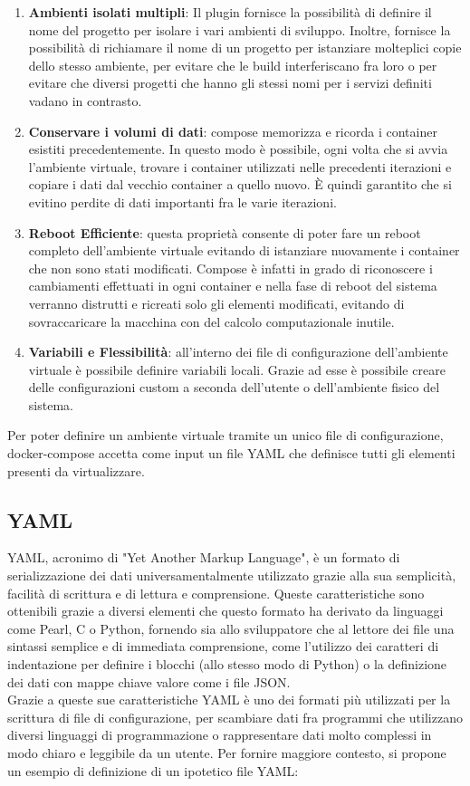 \begin{enumerate}
    \item \textbf{Ambienti isolati multipli}: Il plugin fornisce la possibilità di definire il nome del progetto per isolare i vari ambienti di sviluppo. Inoltre, fornisce la possibilità di richiamare il nome di un progetto per istanziare molteplici copie dello stesso ambiente, per evitare che le build interferiscano fra loro o 
        per evitare che diversi progetti che hanno gli stessi nomi per i servizi definiti vadano in contrasto.
    \item \textbf{Conservare i volumi di dati}: compose memorizza e ricorda i container esistiti precedentemente. In questo modo è possibile, ogni volta che si avvia l'ambiente virtuale, trovare i container utilizzati nelle precedenti iterazioni e copiare i dati dal vecchio container a quello nuovo. 
        È quindi garantito che si evitino perdite di dati importanti fra le varie iterazioni. 
    \item \textbf{Reboot Efficiente}: questa proprietà consente di poter fare un reboot completo dell'ambiente virtuale evitando di istanziare nuovamente i container che non sono stati modificati. Compose è infatti in grado di riconoscere i cambiamenti effettuati in ogni container e nella fase di reboot del sistema verranno distrutti e ricreati
        solo gli elementi modificati, evitando di sovraccaricare la macchina con del calcolo computazionale inutile.
    \item \textbf{Variabili e Flessibilità}: all'interno dei file di configurazione dell'ambiente virtuale è possibile definire variabili locali. Grazie ad esse è possibile creare delle configurazioni custom a seconda dell'utente o dell'ambiente fisico del sistema.
\end{enumerate}

Per poter definire un ambiente virtuale tramite un unico file di configurazione, docker-compose accetta come input un file YAML che definisce tutti gli elementi presenti da virtualizzare. 

\subsection{YAML}
YAML\cite{yaml}, acronimo di "Yet Another Markup Language", è un formato di serializzazione dei dati universamentalmente utilizzato grazie alla sua semplicità, facilità di scrittura e di lettura e comprensione.
Queste caratteristiche sono ottenibili grazie a diversi elementi che questo formato ha derivato da linguaggi come Pearl, C o Python, fornendo sia allo sviluppatore che al lettore dei file una sintassi semplice e di immediata comprensione, come l'utilizzo dei caratteri di indentazione per definire i blocchi (allo stesso modo di Python) o la definizione
dei dati con mappe chiave valore come i file JSON.\\
Grazie a queste sue caratteristiche YAML è uno dei formati più utilizzati per la scrittura di file di configurazione, per scambiare dati fra programmi che utilizzano diversi linguaggi di programmazione o rappresentare dati molto complessi in modo chiaro e leggibile da un utente.
Per fornire maggiore contesto, si propone un esempio di definizione di un ipotetico file YAML:

